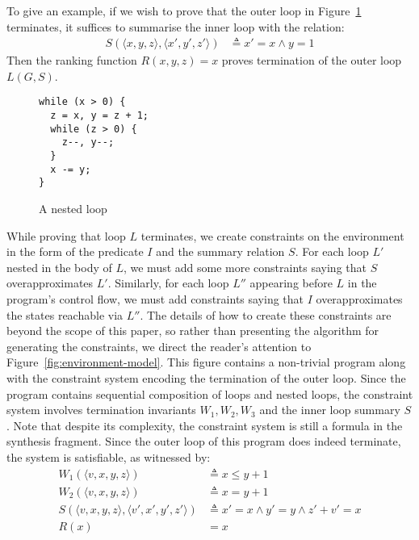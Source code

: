 \documentclass[preprint]{sigplanconf}
\theoremstyle{definition}
\begin{document}
To give an example, if we wish to prove that the outer loop in Figure~\ref{fig:nested} terminates,
it suffices to summarise the inner loop with the relation:
\begin{align*}
S(\langle x, y, z \rangle, \langle x', y', z' \rangle) & \triangleq x' = x \wedge y = 1
\end{align*}
Then the ranking function $R(x, y, z) = x$ proves termination of the outer loop $L(G, S)$.


\begin{figure}
\begin{lstlisting}
while (x > 0) {
  z = x, y = z + 1;
  while (z > 0) {
    z--, y--;
  }
  x -= y;
}
\end{lstlisting}
\caption{A nested loop\label{fig:nested}}
\end{figure}

While proving that loop $L$ terminates, we create constraints on the environment in the
form of the predicate $I$ and the summary relation $S$.  For each loop $L'$ nested in the body
of $L$, we must add some more constraints saying that $S$ overapproximates $L'$.
Similarly, for each loop $L''$ appearing before $L$ in the program's control flow, we
must add constraints saying that $I$ overapproximates the states reachable via $L''$.
The details of how to create these constraints are beyond the scope of this paper, so
rather than presenting the algorithm for generating the constraints, we direct the
reader's attention to Figure~\ref{fig:environment-model}.  This figure contains a non-trivial program
along with the constraint system
encoding the termination of the outer loop.  Since the program contains sequential composition
of loops and nested loops, the constraint
system involves termination invariants $W_1, W_2, W_3$ and the inner loop summary $S$.
Note that despite its complexity, the constraint system is still a formula in the synthesis fragment.
Since the outer loop of this program does indeed terminate, the system is satisfiable, as witnessed by:
\begin{align*}
W_1(\langle v, x, y, z \rangle ) & \triangleq x \leq y + 1 \\
W_2(\langle v, x, y, z \rangle ) & \triangleq x = y + 1 \\
S(\langle v, x, y, z \rangle, \langle v', x', y', z' \rangle) & \triangleq x ' = x \wedge y' = y \wedge z' + v' = x \\
R(x) & = x
\end{align*}
\end{document}
